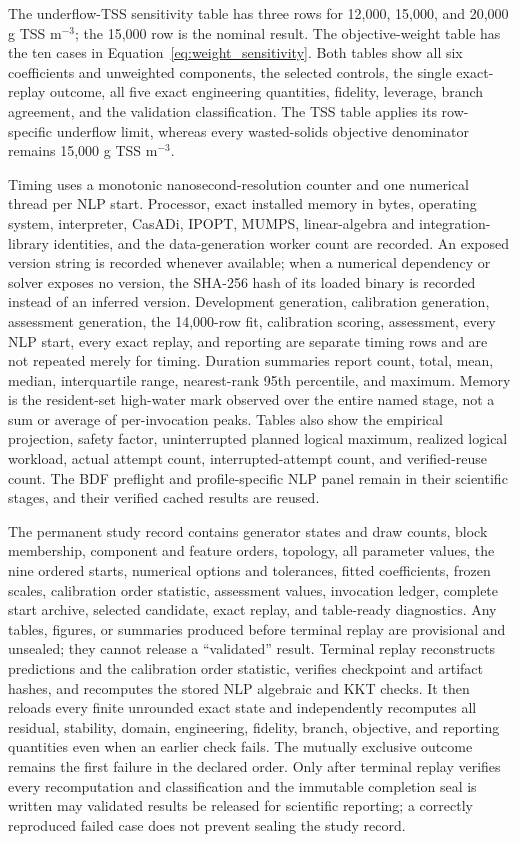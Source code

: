 \documentclass[a4paper,fleqn]{cas-sc}
\begin{document}
The underflow-TSS sensitivity table has three rows for 12,000, 15,000, and 20,000 g TSS m$^{-3}$; the 15,000 row is the nominal result. The objective-weight table has the ten cases in Equation~\eqref{eq:weight_sensitivity}. Both tables show all six coefficients and unweighted components, the selected controls, the single exact-replay outcome, all five exact engineering quantities, fidelity, leverage, branch agreement, and the validation classification. The TSS table applies its row-specific underflow limit, whereas every wasted-solids objective denominator remains 15,000 g TSS m$^{-3}$.

Timing uses a monotonic nanosecond-resolution counter and one numerical thread per NLP start. Processor, exact installed memory in bytes, operating system, interpreter, CasADi, IPOPT, MUMPS, linear-algebra and integration-library identities, and the data-generation worker count are recorded. An exposed version string is recorded whenever available; when a numerical dependency or solver exposes no version, the SHA-256 hash of its loaded binary is recorded instead of an inferred version. Development generation, calibration generation, assessment generation, the 14,000-row fit, calibration scoring, assessment, every NLP start, every exact replay, and reporting are separate timing rows and are not repeated merely for timing. Duration summaries report count, total, mean, median, interquartile range, nearest-rank 95th percentile, and maximum. Memory is the resident-set high-water mark observed over the entire named stage, not a sum or average of per-invocation peaks. Tables also show the empirical projection, safety factor, uninterrupted planned logical maximum, realized logical workload, actual attempt count, interrupted-attempt count, and verified-reuse count. The BDF preflight and profile-specific NLP panel remain in their scientific stages, and their verified cached results are reused.

The permanent study record contains generator states and draw counts, block membership, component and feature orders, topology, all parameter values, the nine ordered starts, numerical options and tolerances, fitted coefficients, frozen scales, calibration order statistic, assessment values, invocation ledger, complete start archive, selected candidate, exact replay, and table-ready diagnostics. Any tables, figures, or summaries produced before terminal replay are provisional and unsealed; they cannot release a ``validated'' result. Terminal replay reconstructs predictions and the calibration order statistic, verifies checkpoint and artifact hashes, and recomputes the stored NLP algebraic and KKT checks. It then reloads every finite unrounded exact state and independently recomputes all residual, stability, domain, engineering, fidelity, branch, objective, and reporting quantities even when an earlier check fails. The mutually exclusive outcome remains the first failure in the declared order. Only after terminal replay verifies every recomputation and classification and the immutable completion seal is written may validated results be released for scientific reporting; a correctly reproduced failed case does not prevent sealing the study record.
\end{document}
